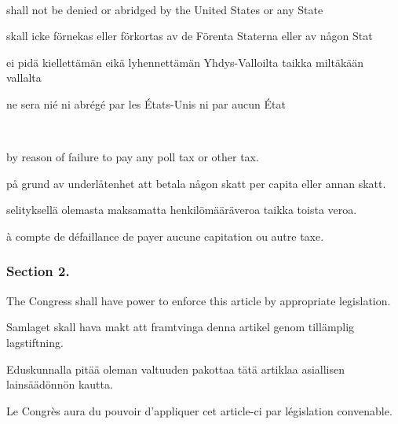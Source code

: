 \documentclass[a4,landscape,12pt]{article}
\begin{document}
~

\begin{minipage}[t]{0.22\textwidth}
shall not be denied or abridged by the United States or any State 
\end{minipage}\textwidth
\begin{minipage}[t]{0.22\textwidth}
skall icke förnekas eller förkortas av de Förenta Staterna eller av någon Stat
\end{minipage}\textwidth
\begin{minipage}[t]{0.22\textwidth}
	 ei pidä kiellettämän eikä lyhennettämän Yhdys-Valloilta taikka miltäkään vallalta
\end{minipage}\textwidth
\begin{minipage}[t]{0.22\textwidth}
	ne sera nié ni abrégé par les États-Unis ni par aucun État
\end{minipage}

~

\begin{minipage}[t]{0.22\textwidth}
	by reason of failure to pay any poll tax or other tax.
\end{minipage}\textwidth
\begin{minipage}[t]{0.22\textwidth}
	 på grund av underlåtenhet att betala någon skatt per capita eller annan skatt.
\end{minipage}\textwidth
\begin{minipage}[t]{0.22\textwidth}
	 selityksellä olemasta maksamatta henkilömääräveroa taikka toista veroa.
\end{minipage}\textwidth
\begin{minipage}[t]{0.22\textwidth}
	à compte de défaillance de payer aucune capitation ou autre taxe.
	\end{minipage}

\subsubsection*{Section 2.}
\begin{minipage}[t]{0.22\textwidth}
	The Congress shall have power to enforce this article by appropriate legislation.
\end{minipage}\textwidth
\begin{minipage}[t]{0.22\textwidth}
	Samlaget skall hava makt att framtvinga denna artikel genom tillämplig lagstiftning.
\end{minipage}\textwidth
\begin{minipage}[t]{0.22\textwidth}
	Eduskunnalla pitää oleman valtuuden pakottaa tätä artiklaa asiallisen lainsäädönnön kautta.
\end{minipage}\textwidth
\begin{minipage}[t]{0.22\textwidth}
Le Congrès aura du pouvoir d'appliquer cet article-ci par législation convenable.
\end{minipage}
\end{document}
